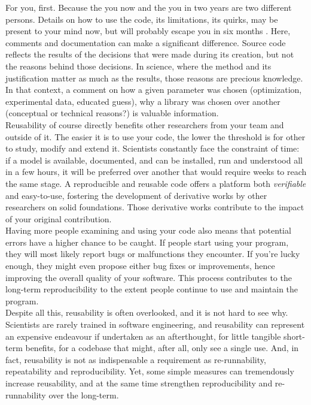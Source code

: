 \documentclass[a4paper,11pt]{article}
\begin{document}
For you, first. Because the you now and the you in two years are two different persons. Details on how to use the code, its limitations, its quirks, may be present to your mind now, but will probably escape you in six months \parencite{Donoho:2009}. Here, comments and documentation can make a significant difference. Source code reflects the results of the decisions that were made during its creation, but not the reasons behind those decisions. In science, where the method and its justification matter as much as the results, those reasons are precious knowledge. In that context, a comment on how a given parameter was chosen (optimization, experimental data, educated guess), why a library was chosen over another (conceptual or technical reasons?) is valuable information.\\


Reusability of course directly benefits other researchers from your team and outside of it. The easier it is to use your code, the lower the threshold is for other to study, modify and extend it. Scientists constantly face the constraint of time: if a model is available, documented, and can be installed, run and understood all in a few hours, it will be preferred over another that would require weeks to reach the same stage. A reproducible and reusable code offers a platform both \emph{verifiable} and easy-to-use, fostering the development of derivative works by other researchers on solid foundations. Those derivative works contribute to the impact of your original contribution.\\

Having more people examining and using your code also means that potential errors have a higher chance to be caught. If people start using your program, they will most likely report bugs or malfunctions they encounter. If you're lucky enough, they might even propose either bug fixes or improvements, hence improving the overall quality of your software. This process contributes to the long-term reproducibility to the extent people continue to use and maintain the program.\\

Despite all this, reusability is often overlooked, and it is not hard to see why. Scientists are rarely trained in software engineering, and reusability can represent an expensive endeavour if undertaken as an afterthought, for little tangible short-term benefits, for a codebase that might, after all, only see a single use. And, in fact, reusability is not as indispensable a requirement as re-runnability, repeatability and reproducibility. Yet, some simple measures can tremendously increase reusability, and at the same time strengthen reproducibility and re-runnability over the long-term.\\
\end{document}
